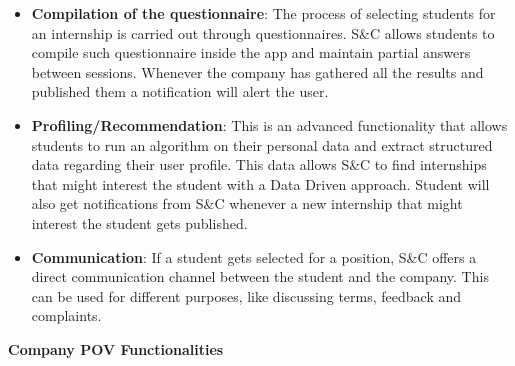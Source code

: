 \begin{itemize}
      \item \textbf{Compilation of the questionnaire}: The process of selecting students for an internship is carried
            out through questionnaires. S\&C allows students to compile such questionnaire inside the app and maintain
            partial answers between sessions. Whenever the company has gathered all the results and published them a
            notification will alert the user.
      \item \textbf{Profiling/Recommendation}: This is an advanced functionality that allows students to run an
            algorithm on their personal data and extract structured data regarding their user profile. This data allows
            S\&C to find internships that might interest the student with a Data Driven approach. Student will also get
            notifications from S\&C whenever a new internship that might interest the student gets published.
      \item \textbf{Communication}: If a student gets selected for a position, S\&C offers a direct communication
            channel between the student and the company. This can be used for different purposes, like discussing
            terms, feedback and complaints.
\end{itemize}

\par\textbf{Company POV Functionalities}

